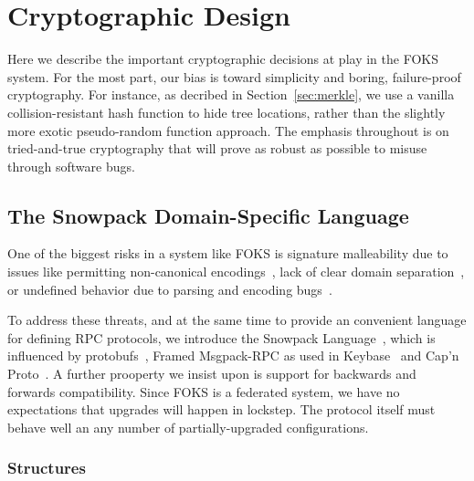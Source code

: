 
\section{Cryptographic Design}

Here we describe the important cryptographic decisions at play in the FOKS
system.  For the most part, our bias is toward simplicity and boring,
failure-proof cryptography.  For instance, as decribed in
Section~\ref{sec:merkle}, we use a vanilla collision-resistant hash function to
hide tree locations, rather than the slightly more exotic pseudo-random function
approach. The emphasis throughout is on tried-and-true cryptography that will
prove as robust as possible to misuse through software bugs.

\subsection{The Snowpack Domain-Specific Language}

One of the biggest risks in a system like FOKS is signature malleability
due to issues like permitting non-canonical encodings~\cite{conf/crypto/Bleichenbacher98,bip66}, 
lack of clear domain separation~\cite{ncc2019,cryptoeprint:2020/241}, 
or undefined behavior due to parsing and encoding bugs~\cite{heartbleed2014durumeric}.

To address these threats, and at the same time to provide an convenient language for 
defining RPC protocols, we introduce the Snowpack Language~\cite{snowpack}, which is influenced
by protobufs~\cite{protobuf}, Framed Msgpack-RPC as used in Keybase~\cite{keybase}
and Cap'n Proto~\cite{capnproto}. A further prooperty we insist upon is support
for backwards and forwards compatibility. Since FOKS is a federated system, we have 
no expectations that upgrades will happen in lockstep. The protocol itself must behave
well an any number of partially-upgraded configurations.

\subsubsection{Structures}
\label{sec:snowpack-structures}

